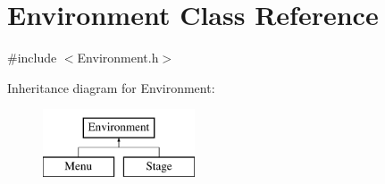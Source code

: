 \hypertarget{class_environment}{}\section{Environment Class Reference}
\label{class_environment}


{\ttfamily \#include $<$Environment.\+h$>$}

Inheritance diagram for Environment\+:\begin{figure}[H]
\begin{center}
\leavevmode
\includegraphics[height=2.000000cm]{class_environment}
\end{center}
\end{figure}
